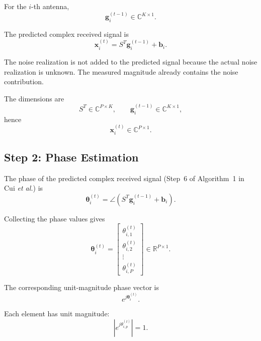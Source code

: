\documentclass[12pt,a4paper]{article}
\begin{document}
For the $i$-th antenna,
\begin{equation}
\mathbf g_i^{(t-1)}
\in
\mathbb{C}^{K\times1}.
\tag{286}
\end{equation}

The predicted complex received signal is
\begin{equation}
\boxed{
\mathbf x_i^{(t)}
=
S^T\mathbf g_i^{(t-1)}
+
\mathbf b_i
}.
\tag{287}
\end{equation}

The noise realization is not added to the predicted signal because
the actual noise realization is unknown. The measured magnitude
already contains the noise contribution.

The dimensions are
\begin{equation}
S^T\in\mathbb{C}^{P\times K},
\qquad
\mathbf g_i^{(t-1)}\in\mathbb{C}^{K\times1},
\tag{288}
\end{equation}
hence
\begin{equation}
\mathbf x_i^{(t)}
\in
\mathbb{C}^{P\times1}.
\tag{289}
\end{equation}

\subsection{Step 2: Phase Estimation}

The phase of the predicted complex received signal (Step~6 of
Algorithm~1 in Cui \emph{et al.}) is
\begin{equation}
\boxed{
\boldsymbol\theta_i^{(t)}
=
\angle
\left(
S^T\mathbf g_i^{(t-1)}
+
\mathbf b_i
\right)
}.
\tag{290}
\end{equation}

Collecting the phase values gives
\begin{equation}
\boldsymbol\theta_i^{(t)}
=
\begin{bmatrix}
\theta_{i,1}^{(t)}\\
\theta_{i,2}^{(t)}\\
\vdots\\
\theta_{i,P}^{(t)}
\end{bmatrix}
\in
\mathbb{R}^{P\times1}.
\tag{291}
\end{equation}

The corresponding unit-magnitude phase vector is
\begin{equation}
e^{j\boldsymbol\theta_i^{(t)}}.
\tag{292}
\end{equation}

Each element has unit magnitude:
\begin{equation}
\left|
e^{j\theta_{i,p}^{(t)}}
\right|
=
1.
\tag{293}
\end{equation}
\end{document}

